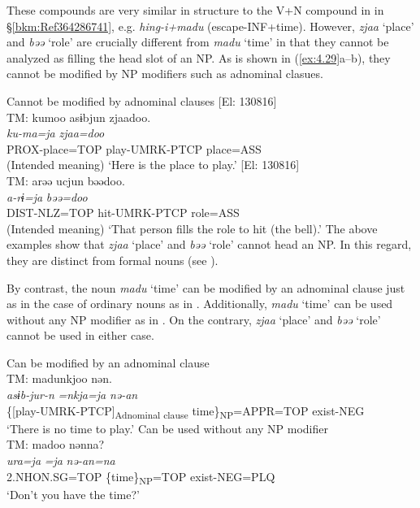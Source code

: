 \begin{exe}
\begin{xlist}
\noindent These compounds are very similar in structure to the V+N compound in  in §\ref{bkm:Ref364286741}, e.g. \textit{hing-i+madu} (escape-INF+time). However, \textit{zjaa} ‘place’ and \textit{bəə} ‘role’ are crucially different from \textit{madu} ‘time’ in that they cannot be analyzed as filling the head slot of an NP. As is shown in (\ref{ex:4.29}a--b), they cannot be modified by NP modifiers such as adnominal clasues.


\ea\label{ex:4.29}Cannot be modified by adnominal clauses
\ea\label{ex.4.29a} [El: 130816]\\
TM: \glll * kumoo {asɨbjun} {zjaadoo.}\\
  {} {\itshape  ku-ma=ja}  {\textit{zjaa=doo}}\\
  {} PROX-place=TOP {play-UMRK-PTCP} {place=ASS}\\
\glt{} (Intended meaning) ‘Here is the place to play.’
\ex\label{ex:4.29b} [El: 130816]\\
 TM: \glll * arəə {ucjun} {bəədoo.}\\
  {} {\itshape  a-rɨ=ja}  {\textit{bəə=doo}}\\
  {} {DIST-NLZ=TOP} {hit-UMRK-PTCP} {role=ASS}\\
 \glt{} (Intended meaning) ‘That person fills the role to hit (the bell).’
\z
\z
\noindent The above examples show that \textit{zjaa} ‘place’ and \textit{bəə} ‘role’ cannot head an NP. In this regard, they are distinct from formal nouns (see ).

By contrast, the noun \textit{madu} ‘time’ can be modified by an adnominal clause just as in the case of ordinary nouns as in . Additionally, \textit{madu} ‘time’ can be used without any NP modifier as in . On the contrary, \textit{zjaa} ‘place’ and \textit{bəə} ‘role’ cannot be used in either case.

\ea\label{ex:4.30}
\ea\label{ex:4.30a}Can be modified by an adnominal clause\hfill\relax[El: 130816]\\
{TM:}  {madunkjoo} {nən.}\\
 {\itshape asɨb-jur-n} \textit{=nkja=ja} {\itshape nə-an}\\
 {\{[play-UMRK-PTCP]\textsubscript{Adnominal clause}} {time\}\textsubscript{NP}=APPR=TOP} {exist-NEG}\\
 \glt{} ‘There is no time to play.’
\ex\label{ex:4.30b}Can be used without any NP modifier\hfill\relax[El: 130816]\\
{TM:}  {madoo} {nənna?}\\
 {\itshape ura=ja} \textit{=ja} {\itshape nə-an=na}\\
 {2.NHON.SG=TOP} {\{time\}\textsubscript{NP}=TOP} {exist-NEG=PLQ}\\
 \glt{} ‘Don’t you have the time?’
\z
\z


\end{xlist}
\end{exe}
